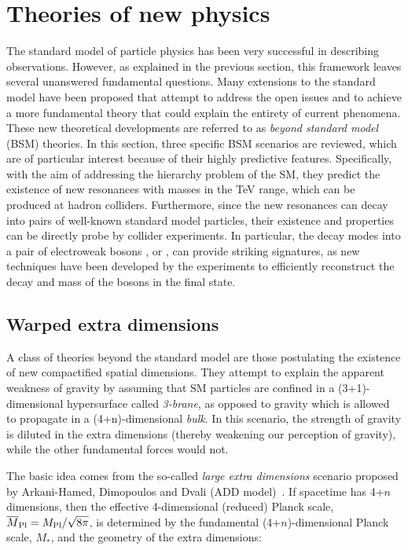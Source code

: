 \section{Theories of new physics}
\label{sec:BSMintro}

The standard model of particle physics has been very successful in describing observations. 
However, as explained in the previous section, this framework leaves several unanswered fundamental questions.
Many extensions to the standard model have been proposed that attempt to address the open issues and to achieve a more fundamental theory
that could explain the entirety of current phenomena.
These new theoretical developments are referred to as \textit{beyond standard model} (BSM) theories.
In this section, three specific BSM scenarios are reviewed, which are of particular interest because of their highly predictive features.
Specifically, with the aim of addressing the hierarchy problem of the SM, they predict the existence of new resonances with masses in the TeV range,
which can be produced at hadron colliders.
Furthermore, since the new resonances can decay into pairs of well-known standard model particles, their existence and properties can be directly probe by collider experiments.
In particular, the decay modes into a pair of electroweak bosons \PW, \PZ or \PH, can provide striking signatures, as new techniques have been developed by the experiments to efficiently reconstruct the decay and mass of the bosons in the final state.

\subsection{Warped extra dimensions}\label{subsec:graviton}

A class of theories beyond the standard model are those postulating the existence of new compactified spatial dimensions.
They attempt to explain the apparent weakness of gravity by assuming that SM particles are confined in a (3+1)-dimensional hypersurface called \textit{3-brane},
as opposed to gravity which is allowed to propagate in a (4+n)-dimensional \textit{bulk}.
In this scenario, the strength of gravity is diluted in the extra dimensions (thereby weakening our perception of gravity), while the other fundamental forces would not.

The basic idea comes from the so-called \textit{large extra dimensions} scenario proposed by Arkani-Hamed, Dimopoulos and Dvali (ADD model)~\cite{ArkaniHamed:1998rs}.
If spacetime has 4+$n$ dimensions, then the effective 4-dimensional (reduced) Planck scale, $\overline{M}_\mathrm{Pl} = M_\mathrm{Pl}/\sqrt{8\pi}$,
is determined by the fundamental (4+$n$)-dimensional Planck scale, $M_*$, and the geometry of the extra dimensions:

